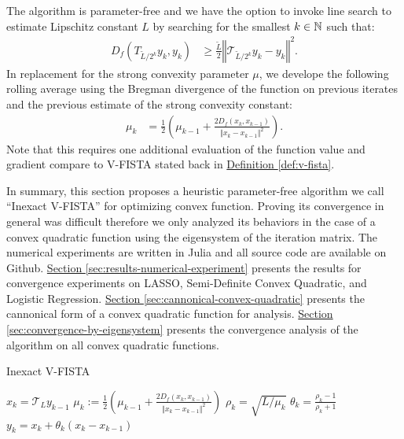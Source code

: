\documentclass[12pt]{article}
\begin{document}
    The algorithm is parameter-free and we have the option to invoke line search to estimate Lipschitz constant $L$ by searching for the smallest $k \in \mathbb N$ such that: 
    \begin{align*}
        D_f\left(T_{\tilde L/2^k}y_k, y_k\right)
        &\ge 
        \frac{\tilde L}{2}
        \left\Vert 
            \mathcal T_{\widetilde{L}/2^k}y_k - y_k
        \right\Vert^2. 
    \end{align*}
    In replacement for the strong convexity parameter $\mu$, we develope the following rolling average using the Bregman divergence of the function on previous iterates and the previous estimate of the strong convexity constant: 
    \begin{align*}
        \mu_k &= 
        \frac{1}{2}
        \left(
            \mu_{k - 1} + 
            \frac{2D_f(x_k, x_{k - 1})}{\Vert x_k - x_{k -1}\Vert^2}
        \right). 
    \end{align*}
    Note that this requires one additional evaluation of the function value and gradient compare to V-FISTA stated back in 
    \hyperref[def:v-fista]{Definition \ref*{def:v-fista}}. 

    In summary, this section proposes a heuristic parameter-free algorithm we call ``Inexact V-FISTA'' for optimizing convex function. 
    Proving its convergence in general was difficult therefore we only analyzed its behaviors in the case of a convex quadratic function using the eigensystem of the iteration matrix. 
    The numerical experiments are written in Julia \cite{bezanson_julia_2017} and all source code are available on Github. %
    \hyperref[sec:results-numerical-experiment]{Section \ref*{sec:results-numerical-experiment}} 
    presents the results for convergence experiments on LASSO, Semi-Definite Convex Quadratic, and Logistic Regression. 
    \hyperref[sec:cannonical-convex-quadratic]{Section \ref*{sec:cannonical-convex-quadratic}}
    presents the cannonical form of a convex quadratic function for analysis. 
    \hyperref[sec:convergence-by-eigensystem]{Section \ref*{sec:convergence-by-eigensystem}}
    presents the convergence analysis of the algorithm on all convex quadratic functions. 
    \begin{algorithm}
        \caption{Inexact V-FISTA}\label{alg:inexact-vfista}
        \begin{algorithmic}[1]
                    \State $x_k = \mathcal{T}_L y_{k - 1}$
                    \State $\mu_k := \frac{1}{2}
                        \left(\mu_{k - 1} + \frac{2D_f(x_k, x_{k - 1})}{\Vert x_k - x_{k - 1}\Vert^2}\right)$
                    \State $\rho_k = \sqrt{L/\mu_k}$
                    \State $\theta_k = \frac{\rho_k - 1}{\rho_k + 1}$
                    \State $y_k = x_k + \theta_k(x_k - x_{k - 1})$
                \EndFor
            \EndProcedure
        \end{algorithmic}
    \end{algorithm}
    
\end{document}
